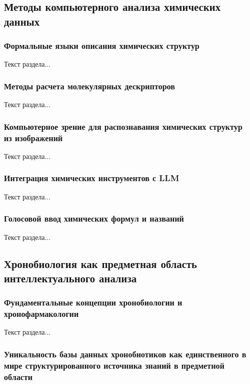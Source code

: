 \subsection{Методы компьютерного анализа химических данных}

\subsubsection{Формальные языки описания химических структур}

Текст раздела...

\subsubsection{Методы расчета молекулярных дескрипторов}

Текст раздела...

\subsubsection{Компьютерное зрение для распознавания химических структур из изображений}

Текст раздела...

\subsubsection{Интеграция химических инструментов с LLM}

Текст раздела...

\subsubsection{Голосовой ввод химических формул и названий}

Текст раздела...

\subsection{Хронобиология как предметная область интеллектуального анализа}

\subsubsection{Фундаментальные концепции хронобиологии и хронофармакологии}

Текст раздела...

\subsubsection{Уникальность базы данных хронобиотиков как единственного в мире структурированного источника знаний в предметной области}


